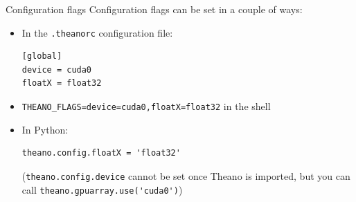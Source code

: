 \documentclass[a4paper,9pt]{beamer}
\begin{document}
\begin{frame}[fragile]{Configuration flags}
  Configuration flags can be set in a couple of ways:
  \begin{itemize}
    \item In the \verb|.theanorc| configuration file:
      \begin{verbatim}
[global]
device = cuda0
floatX = float32
      \end{verbatim}
    \item \verb|THEANO_FLAGS=device=cuda0,floatX=float32| in the shell
    \item In Python:
      \begin{verbatim}
theano.config.floatX = 'float32'
      \end{verbatim}
      (\verb|theano.config.device| cannot be set once Theano is imported, but you can call \verb|theano.gpuarray.use('cuda0')|)
  \end{itemize}
\end{frame}



\end{document}
